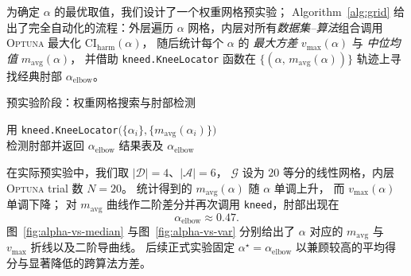 \documentclass[10pt]{article} %
\numberwithin{equation}{section}
\begin{document}
\textcolor[rgb]{0.00,0.07,1.00}{为确定 $\alpha$ 的最优取值，我们设计了一个权重网格预实验；
Algorithm \ref{alg:grid} 给出了完全自动化的流程：外层遍历
$\alpha$ 网格，内层对所有\emph{数据集--算法}组合调用
\textsc{Optuna} 最大化 $\text{CI}_{\mathrm{harm}}(\alpha)$，
随后统计每个 $\alpha$ 的
\emph{最大方差} $v_{\max}(\alpha)$ 与 \emph{中位均值} $m_{\mathrm{avg}}(\alpha)$，
并借助 \texttt{kneed.KneeLocator} 函数在
$\bigl\{(\alpha,\,m_{\mathrm{avg}}(\alpha))\bigr\}$ 轨迹上寻找经典肘部
$\alpha_{\text{elbow}}$。}

\begin{algorithm}[t]
\caption{\textcolor[rgb]{0.00,0.07,1.00}{预实验阶段：权重网格搜索与肘部检测}}
\label{alg:grid}

用 \texttt{kneed.KneeLocator}$\bigl(\{\alpha_i\},\{m_{\mathrm{avg}}(\alpha_i)\}\bigr)$\\
检测肘部并返回 $\alpha_{\text{elbow}}$\;
\KwRet 结果表及 $\alpha_{\text{elbow}}$
\end{algorithm}

\textcolor[rgb]{0.00,0.07,1.00}{在实际预实验中，我们取 $|\mathcal{D}|=4$、$|\mathcal{A}|=6$，
$\mathcal{G}$ 设为 $20$ 等分的线性网格，内层
\textsc{Optuna} trial 数 $N=20$。
统计得到的
$m_{\mathrm{avg}}(\alpha)$ 随 $\alpha$ 单调上升，
而 $v_{\max}(\alpha)$ 单调下降；
对 $m_{\mathrm{avg}}$ 曲线作二阶差分并再次调用
\texttt{kneed}，肘部出现在
\[
\boxed{\alpha_{\text{elbow}}\approx0.47}.
\]
图~\ref{fig:alpha-vs-median} 与图~\ref{fig:alpha-vs-var}
分别给出了 $\alpha$ 对应的 $m_{\mathrm{avg}}$ 与 $v_{\max}$ 折线以及二阶导曲线。
后续正式实验固定
$\alpha^\star=\alpha_{\text{elbow}}$
以兼顾较高的平均得分与显著降低的跨算法方差。}
\end{document}
